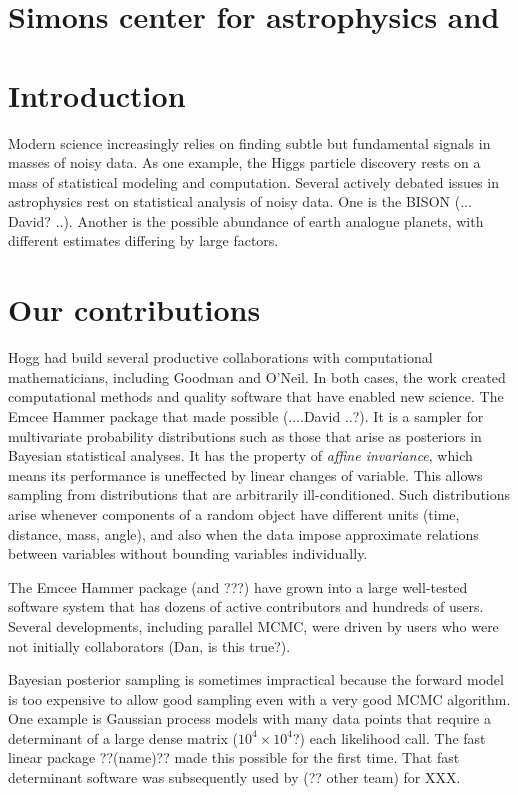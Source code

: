 \documentclass[12pt]{article}
\begin{document}
\section*{Simons center for astrophysics and}

\textbf{}

\section*{Introduction}

Modern science increasingly relies on finding subtle but fundamental signals in masses 
of noisy data.
As one example, the Higgs particle discovery rests on a mass of statistical modeling 
and computation.
Several actively debated issues in astrophysics rest on statistical analysis of noisy data.
One is the BISON (... David? ..).
Another is the possible abundance of earth analogue planets, with different estimates 
differing by large factors.


\section*{Our contributions}
Hogg had build several productive collaborations with computational mathematicians, including
Goodman and O'Neil.
In both cases, the work created computational methods and quality software that have enabled
new science.
The Emcee Hammer package that made possible (....David ..?). 
It is a sampler for multivariate probability distributions such as those that arise
as posteriors in Bayesian statistical analyses.
It has the property of {\em affine invariance}, which means its performance is uneffected  
by linear changes of variable.
This allows sampling from distributions that are arbitrarily ill-conditioned.
Such distributions arise whenever components of a random object have different
units (time, distance, mass, angle), and also when the data impose approximate relations 
between variables without bounding variables individually.

The Emcee Hammer package (and ???) have grown into a large well-tested software system
that has dozens of active contributors and hundreds of users.
Several developments, including parallel MCMC, were driven by users who were not
initially collaborators (Dan, is this true?).

Bayesian posterior sampling is sometimes impractical because the forward model is too 
expensive to allow good sampling even with a very good MCMC algorithm.
One example is Gaussian process models with many data points that require a determinant
of a large dense matrix ($10^4\times 10^4$?) each likelihood call.
The fast linear package ??(name)?? made this possible for the first time.
That fast determinant software was subsequently used by (?? other team) for XXX.
\end{document}
